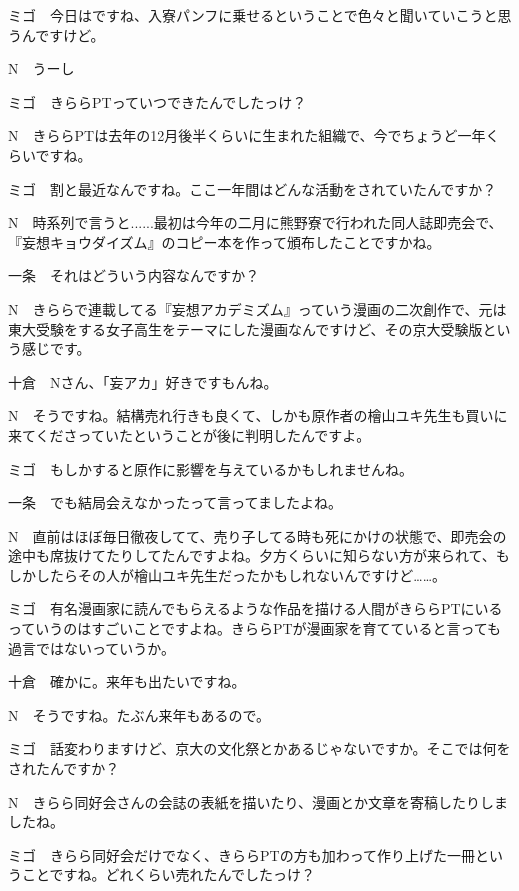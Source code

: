 \begin{multicols}{2}
\begin{description}
  \item{ミゴ}　今日はですね、入寮パンフに乗せるということで色々と聞いていこうと思うんですけど。
  \item{N}　うーし
  \item{ミゴ}　きららPTっていつできたんでしたっけ？
  \item{N}　きららPTは去年の12月後半くらいに生まれた組織で、今でちょうど一年くらいですね。
  \item{ミゴ}　割と最近なんですね。ここ一年間はどんな活動をされていたんですか？
  \item{N}　時系列で言うと......最初は今年の二月に熊野寮で行われた同人誌即売会で、『妄想キョウダイズム』のコピー本を作って頒布したことですかね。
  \item{一条}　それはどういう内容なんですか？
  \item{N}　きららで連載してる『妄想アカデミズム』っていう漫画の二次創作で、元は東大受験をする女子高生をテーマにした漫画なんですけど、その京大受験版という感じです。
  \item{十倉}　Nさん、「妄アカ」好きですもんね。
  \item{N}　そうですね。結構売れ行きも良くて、しかも原作者の檜山ユキ先生も買いに来てくださっていたということが後に判明したんですよ。
  \item{ミゴ}　もしかすると原作に影響を与えているかもしれませんね。
  \item{一条}　でも結局会えなかったって言ってましたよね。
  \item{N}　直前はほぼ毎日徹夜してて、売り子してる時も死にかけの状態で、即売会の途中も席抜けてたりしてたんですよね。夕方くらいに知らない方が来られて、もしかしたらその人が檜山ユキ先生だったかもしれないんですけど……。
  \item{ミゴ}　有名漫画家に読んでもらえるような作品を描ける人間がきららPTにいるっていうのはすごいことですよね。きららPTが漫画家を育てていると言っても過言ではないっていうか。
  \item{十倉}　確かに。来年も出たいですね。
  \item{N}　そうですね。たぶん来年もあるので。
  \item{ミゴ}　話変わりますけど、京大の文化祭とかあるじゃないですか。そこでは何をされたんですか？
  \item{N}　きらら同好会さんの会誌の表紙を描いたり、漫画とか文章を寄稿したりしましたね。
  \item{ミゴ}　きらら同好会だけでなく、きららPTの方も加わって作り上げた一冊ということですね。どれくらい売れたんでしたっけ？

\end{description}
\end{multicols}
